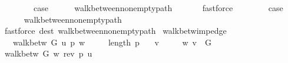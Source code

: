 \begin{isabellebody}
\isanewline
\ \ \isamarkupfalse%
\ {}\isanewline
\ \ \isamarkupfalse%
\ {\isacharquery}{\kern0pt}case\isanewline
\ \ \ \ \isamarkupfalse%
\ walk{\isacharunderscore}{\kern0pt}between{\isacharunderscore}{\kern0pt}nonempty{\isacharunderscore}{\kern0pt}path{\isacharparenleft}{\kern0pt}{}{\isacharcomma}{\kern0pt}\ {}{\isacharparenright}{\kern0pt}\isanewline
\ \ \ \ \isamarkupfalse%
\ fastforce\isanewline
{}\isamarkupfalse%
\isanewline
\ \ \isamarkupfalse%
\ {}\isanewline
\ \ \isamarkupfalse%
\ {\isacharquery}{\kern0pt}case\isanewline
\ \ \ \ \isamarkupfalse%
\ walk{\isacharunderscore}{\kern0pt}between{\isacharunderscore}{\kern0pt}nonempty{\isacharunderscore}{\kern0pt}path{\isacharparenleft}{\kern0pt}{}{\isacharparenright}{\kern0pt}\isanewline
\ \ \ \ \isamarkupfalse%
\ {\isacharparenleft}{\kern0pt}fastforce\ dest{\isacharcolon}{\kern0pt}\ walk{\isacharunderscore}{\kern0pt}between{\isacharunderscore}{\kern0pt}nonempty{\isacharunderscore}{\kern0pt}path{\isacharparenleft}{\kern0pt}{}{\isacharparenright}{\kern0pt}{\isacharparenright}{\kern0pt}\isanewline
{}\isamarkupfalse%
%
\endisatagproof
{\isafoldproof}%
%
\isadelimproof
\isanewline
%
\endisadelimproof
%
\isadeliminvisible
\isanewline
%
\endisadeliminvisible
%
\isataginvisible
{}\isamarkupfalse%
\ walk{\isacharunderscore}{\kern0pt}betw{\isacharunderscore}{\kern0pt}imp{\isacharunderscore}{\kern0pt}edge{\isacharunderscore}{\kern0pt}{}{\isacharcolon}{\kern0pt}\isanewline
\ \ \ {\isachardoublequoteopen}walk{\isacharunderscore}{\kern0pt}betw\ G\ u\ p\ w{\isachardoublequoteclose}\isanewline
\ \ \ {\isachardoublequoteopen}{}\ {\isasymle}\ length\ p{\isachardoublequoteclose}\isanewline
\ \ \ v\ \isanewline
\ \ \ \ {\isachardoublequoteopen}{\isacharbraceleft}{\kern0pt}w{\isacharcomma}{\kern0pt}\ v{\isacharbraceright}{\kern0pt}\ {\isasymin}\ G{\isachardoublequoteclose}%
\endisataginvisible
{\isafoldinvisible}%
%
\isadeliminvisible
\isanewline
%
\endisadeliminvisible
%
\isadelimproof
%
\endisadelimproof
%
\isatagproof
{}\isamarkupfalse%
\ {\isacharminus}{\kern0pt}\isanewline
\ \ \isamarkupfalse%
\ {\isachardoublequoteopen}walk{\isacharunderscore}{\kern0pt}betw\ G\ w\ {\isacharparenleft}{\kern0pt}rev\ p{\isacharparenright}{\kern0pt}\ u{\isachardoublequoteclose}\isanewline

\end{isabellebody}
